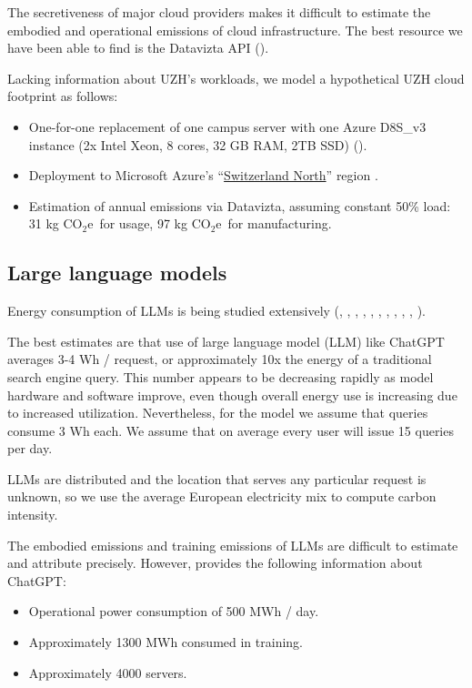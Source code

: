\documentclass[11pt]{article}
\newcommand{\coe}{CO$_2$e}
\newcommand{\gcoe}{g \coe}
\newcommand{\kgcoe}{k\gcoe}
\begin{document}
The secretiveness of major cloud providers makes it difficult to estimate the embodied and operational emissions of cloud
infrastructure. The best resource we have been able to find is the Datavizta API (\cite{boavizta}).

Lacking information about UZH's workloads, we model a hypothetical UZH cloud footprint as follows:
\begin{itemize}
    \item One-for-one replacement of one campus server with one Azure D8S\_v3 instance (2x Intel
      Xeon, 8 cores, 32 GB RAM, 2TB SSD) (\cite{msftvms}).
    \item Deployment to Microsoft Azure's ``\href{https://datacenters.microsoft.com/globe/explore?info=region_switzerlandnorth}{Switzerland North}'' region .
    \item Estimation of annual emissions via Datavizta, assuming constant 50\% load: 31 \kgcoe\ for usage,
      97 \kgcoe\ for manufacturing.
\end{itemize}

\subsection{Large language models}

Energy consumption of LLMs is being studied extensively (\cite{budennyy2022eco2ai},
\cite{castano2023exploring},
\cite{devries2023growing},
\cite{gowda2024watt},
\cite{harding2024watts},
\cite{heguerte2023estimate},
\cite{luccioni2022estimating},
\cite{luccioni2023counting},
\cite{patterson2021carbon},
\cite{rodriguez2024evaluating},
\cite{tripp2024measuring}).

The best estimates are that use of large language model (LLM) like ChatGPT averages 3-4 Wh / request,
or approximately 10x the energy of a traditional search engine query. This number appears to be decreasing
rapidly as model hardware and software improve, even though overall energy use is increasing due to
increased utilization. Nevertheless, for the model we assume that queries consume 3 Wh each.
We assume that on average every user will issue 15 queries per day.

LLMs are distributed and the location that serves any particular request is unknown, so we use the
average European electricity mix to compute carbon intensity.

The embodied emissions and training emissions of LLMs are difficult to estimate and attribute precisely.
However, \textcite{devries2023growing} provides the following information about ChatGPT:
\begin{itemize}
    \item Operational power consumption of 500 MWh / day.
    \item Approximately 1300 MWh consumed in training.
    \item Approximately 4000 servers.
\end{itemize}
\end{document}
